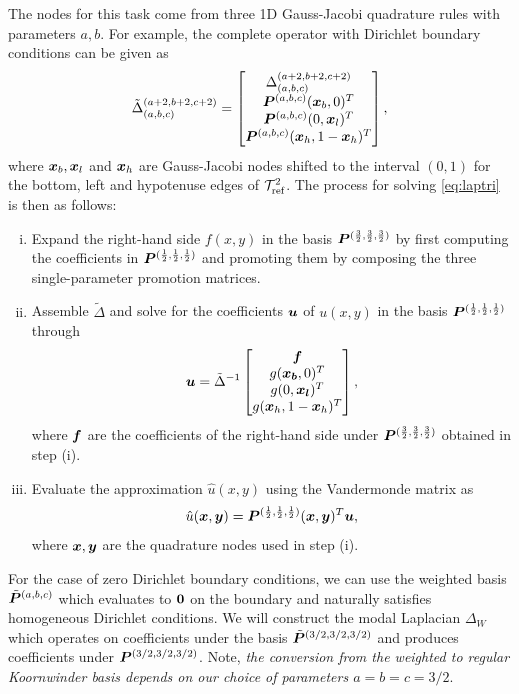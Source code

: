 The nodes for this task come from three 1D Gauss-Jacobi quadrature rules with parameters $a,b$. For example, the complete operator with Dirichlet boundary conditions can be given as 
 \begin{equation}
 \tilde{\Delta}_{(a,b,c)}^{(a+2,b+2,c+2)} = \begin{bmatrix}\Delta_{(a,b,c)}^{(a+2,b+2,c+2)} \\
 \boldsymbol{P}^{(a,b,c)}(\boldsymbol{x}_b,0)^T\\
 \boldsymbol{P}^{(a,b,c)}(0,\boldsymbol{x}_l)^T\\
 \boldsymbol{P}^{(a,b,c)}(\boldsymbol{x}_h,1-\boldsymbol{x}_h)^T\end{bmatrix},
 \end{equation}
where $\boldsymbol{x}_b,\boldsymbol{x}_l$ and $\boldsymbol{x}_h$ are Gauss-Jacobi nodes shifted to the interval $(0,1)$ for the bottom, left and hypotenuse edges of $\mathcal{T}_{\text{ref}}^2$. The process for solving \eqref{eq:laptri} is then as follows:
\begin{enumerate}[(i)]
	\item Expand the right-hand side $f(x,y)$ in the basis $\boldsymbol{P}^{(\frac{3}{2},\frac{3}{2},\frac{3}{2})}$ by first computing the coefficients in $\boldsymbol{P}^{(\frac{1}{2},\frac{1}{2},\frac{1}{2})}$ and promoting them by composing the three single-parameter promotion matrices. 
	\item Assemble $\tilde{\Delta}$ and solve for the coefficients $\boldsymbol{u}$ of $u(x,y)$ in the basis $\boldsymbol{P}^{(\frac{1}{2},\frac{1}{2},\frac{1}{2})}$ through $$\boldsymbol{u} = \tilde{\Delta}^{-1}\begin{bmatrix}\boldsymbol{f}\\
	g(\boldsymbol{x_b},0)^T\\g(0,\boldsymbol{x_l})^T\\g(\boldsymbol{x}_h,1-\boldsymbol{x}_h)^T\end{bmatrix},$$ where $\boldsymbol{f}$ are the coefficients of the right-hand side under $\boldsymbol{P}^{(\frac{3}{2},\frac{3}{2},\frac{3}{2})}$ obtained in step (i).
	\item Evaluate the approximation $\hat{u}(x,y)$ using the Vandermonde matrix as $$\hat{u}(\boldsymbol{x},\boldsymbol{y}) = \boldsymbol{P}^{(\frac{1}{2},\frac{1}{2},\frac{1}{2})}(\boldsymbol{x},\boldsymbol{y})^T\boldsymbol{u},$$ where $\boldsymbol{x},\boldsymbol{y}$ are the quadrature nodes used in step (i).
\end{enumerate}


For the case of zero Dirichlet boundary conditions, we can use the weighted basis $\tilde{\boldsymbol{P}}^{(a,b,c)}$ which evaluates to $\boldsymbol{0}$ on the boundary and naturally satisfies homogeneous Dirichlet conditions. We will construct the modal Laplacian $\Delta_W$ which operates on coefficients under the basis $\tilde{\boldsymbol{P}}^{(3/2,3/2,3/2)}$ and produces coefficients under $\boldsymbol{P}^{(3/2,3/2,3/2)}$. Note, \emph{the conversion from the weighted to regular Koornwinder basis depends on our choice of parameters $a=b=c=3/2$}. 

